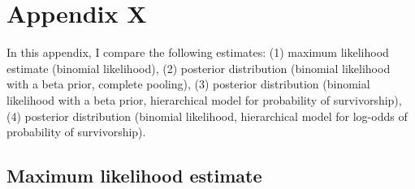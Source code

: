 \documentclass[12pt, oneside, titlepage]{article}   	%
\begin{document}
 

\section*{Appendix X}


In this appendix, I compare the following estimates: (1) maximum likelihood estimate (binomial likelihood), (2) posterior distribution (binomial likelihood with a beta prior, complete pooling), (3) posterior distribution (binomial likelihood with a beta prior, hierarchical model for probability of survivorship), (4) posterior distribution (binomial likelihood, hierarchical model for log-odds of probability of survivorship).

\subsection*{Maximum likelihood estimate}

\end{document}
